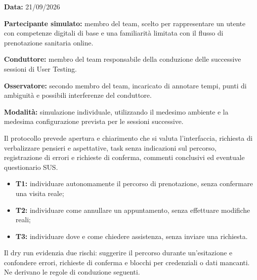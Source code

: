 \textbf{Data:} 21/09/2026

\textbf{Partecipante simulato:} membro del team, scelto per
rappresentare un utente con competenze digitali di base e una
familiarità limitata con il flusso di prenotazione sanitaria online.

\textbf{Conduttore:} membro del team responsabile della conduzione
delle successive sessioni di User Testing.

\textbf{Osservatore:} secondo membro del team, incaricato di annotare
tempi, punti di ambiguità e possibili interferenze del conduttore.

\textbf{Modalità:} simulazione individuale, utilizzando il medesimo
ambiente e la medesima configurazione prevista per le sessioni successive.


Il protocollo prevede apertura e chiarimento che si valuta l'interfaccia,
richiesta di verbalizzare pensieri e aspettative, task senza indicazioni
sul percorso, registrazione di errori e richieste di conferma, commenti
conclusivi ed eventuale questionario SUS.


\begin{itemize}
\item \textbf{T1:} individuare autonomamente il percorso di prenotazione,
  senza confermare una visita reale;
\item \textbf{T2:} individuare come annullare un appuntamento,
  senza effettuare modifiche reali;
\item \textbf{T3:} individuare dove e come chiedere assistenza,
  senza inviare una richiesta.
\end{itemize}


Il dry run evidenzia due rischi: suggerire il percorso durante un'esitazione
e confondere errori, richieste di conferma e blocchi per credenziali o dati
mancanti. Ne derivano le regole di conduzione seguenti.


